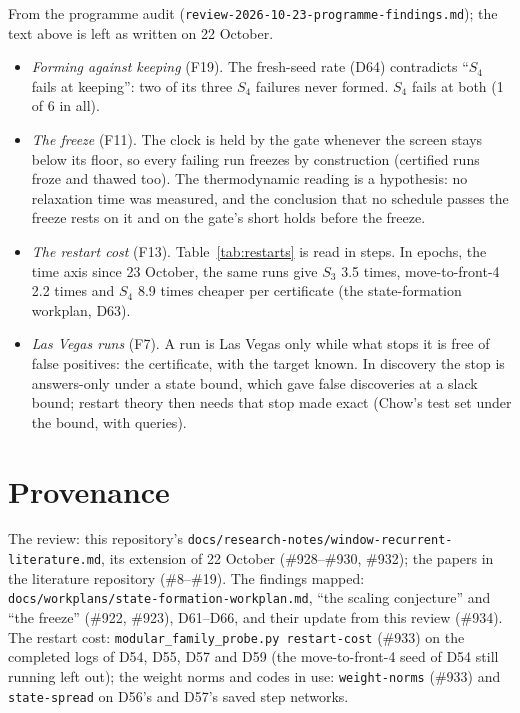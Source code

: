 \documentclass[11pt]{article}
\begin{document}
From the programme audit (\texttt{review-2026-10-23-programme-findings.md}); the text above is left
as written on 22 October.
\begin{itemize}
  \item \emph{Forming against keeping} (F19). The fresh-seed rate (D64) contradicts ``$S_4$ fails at
  keeping'': two of its three $S_4$ failures never formed. $S_4$ fails at both (1 of 6 in all).
  \item \emph{The freeze} (F11). The clock is held by the gate whenever the screen stays below its
  floor, so every failing run freezes by construction (certified runs froze and thawed too). The
  thermodynamic reading is a hypothesis: no relaxation time was measured, and the conclusion that
  no schedule passes the freeze rests on it and on the gate's short holds before the freeze.
  \item \emph{The restart cost} (F13). Table~\ref{tab:restarts} is read in steps. In epochs, the time
  axis since 23 October, the same runs give $S_3$ 3.5 times, move-to-front-4 2.2 times and $S_4$ 8.9
  times cheaper per certificate (the state-formation workplan, D63).
  \item \emph{Las Vegas runs} (F7). A run is Las Vegas only while what stops it is free of false
  positives: the certificate, with the target known. In discovery the stop is answers-only under a
  state bound, which gave false discoveries at a slack bound; restart theory then needs that stop
  made exact (Chow's test set under the bound, with queries).
\end{itemize}

\section{Provenance}

The review: this repository's \texttt{docs/\allowbreak research-notes/\allowbreak window-recurrent-\allowbreak literature.md}, its extension of
22 October (\#928--\#930, \#932); the papers in the literature repository (\#8--\#19). The findings
mapped: \texttt{docs/\allowbreak workplans/\allowbreak state-formation-\allowbreak workplan.md}, ``the scaling conjecture'' and ``the freeze''
(\#922, \#923), D61--D66, and their update from this review (\#934). The restart cost: \texttt{modular\_family\_probe.py restart-cost} (\#933) on the
completed logs of D54, D55, D57 and D59 (the move-to-front-4 seed of D54 still running left out);
the weight norms and codes in use: \texttt{weight-norms} (\#933) and \texttt{state-spread} on D56's and
D57's saved step networks.



\end{document}
